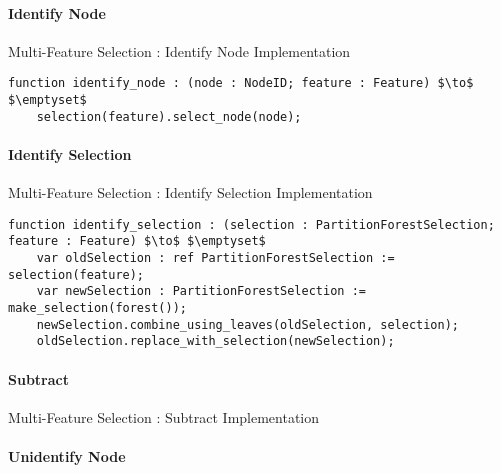 \paragraph{Identify Node}

\begin{stulisting}[H]
\caption{Multi-Feature Selection : Identify Node Implementation}
\begin{lstlisting}[style=Default]
function identify_node : (node : NodeID; feature : Feature) $\to$ $\emptyset$
	selection(feature).select_node(node);
\end{lstlisting}
\end{stulisting}

\paragraph{Identify Selection}

\begin{stulisting}[H]
\caption{Multi-Feature Selection : Identify Selection Implementation}
\begin{lstlisting}[style=Default]
function identify_selection : (selection : PartitionForestSelection; feature : Feature) $\to$ $\emptyset$
	var oldSelection : ref PartitionForestSelection := selection(feature);
	var newSelection : PartitionForestSelection := make_selection(forest());
	newSelection.combine_using_leaves(oldSelection, selection);
	oldSelection.replace_with_selection(newSelection);
\end{lstlisting}
\end{stulisting}

\paragraph{Subtract}

\begin{stulisting}[H]
\caption{Multi-Feature Selection : Subtract Implementation}

\end{stulisting}

\paragraph{Unidentify Node}

